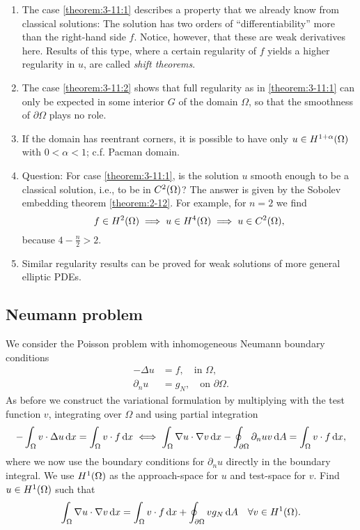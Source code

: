 \begin{remark}
	\begin{enumerate}
		\item The case \ref{theorem:3-11:1} describes a property that we already know from classical solutions:
		The solution has two orders of ``differentiability'' more than the right-hand side \(f\).
		Notice, however, that these are weak derivatives here.
		Results of this type, where a certain regularity of \(f\) yields a higher regularity in \(u\), are called \emph{shift theorems}.
		\item The case \ref{theorem:3-11:2} shows that full regularity as in \ref{theorem:3-11:1} can only be expected in some interior \(G\) of the domain \(\Omega\), so that the smoothness of \(\partial\Omega\) plays no role.
		\item If the domain has reentrant corners, it is possible to have only \(u \in H^{1 + \alpha}\parentheses*{\Omega}\) with \(0 < \alpha < 1\); c.f. Pacman domain.
		\item Question:
		For case \ref{theorem:3-11:1}, is the solution \(u\) smooth enough to be a classical solution, i.e., to be in \(C^2\parentheses*{\Omega}\)?
		The answer is given by the Sobolev embedding theorem \ref{theorem:2-12}.
		For example, for \(n = 2\) we find
		\[
			f \in H^2\parentheses*{\Omega} \implies u \in H^4\parentheses*{\Omega} \implies u \in C^2\parentheses*{\Omega},
		\]
		because \(4 - \frac{n}{2} > 2\).
		\item Similar regularity results can be proved for weak solutions of more general elliptic PDEs.
	\end{enumerate}
\end{remark}


\subsection{Neumann problem}

We consider the Poisson problem with inhomogeneous Neumann boundary conditions
\begin{align*}
    -\Delta u &= f, \quad \text{in }\Omega,\\
    \partial_n u &= g_N, \quad \text{on }\partial\Omega.
\end{align*}
As before we construct the variational formulation by multiplying with the test function \(v\), integrating over \(\Omega\) and using partial integration
\[
    -\int_\Omega v \cdot \Delta u\mathop{\mathrm{d}\!} x = \int_\Omega v \cdot f\mathop{\mathrm{d}\!} x \iff \int_\Omega \nabla u \cdot \nabla v\mathop{\mathrm{d}\!} x - \oint_{\partial\Omega}\partial_n uv\mathop{\mathrm{d}\!} A = \int_\Omega v \cdot f\mathop{\mathrm{d}\!} x,
\]
where we now use the boundary conditions for \(\partial_n u\) directly in the boundary integral.
We use \(H^1\parentheses*{\Omega}\) as the approach-space for \(u\) and test-space for \(v\).
Find \(u \in H^1\parentheses*{\Omega}\) such that
\[
    \int_\Omega \nabla u \cdot \nabla v\d x = \int_\Omega v \cdot f\d x + \oint_{\partial\Omega}vg_N\d A \quad \forall v \in H^1\parentheses*{\Omega}.
\]

